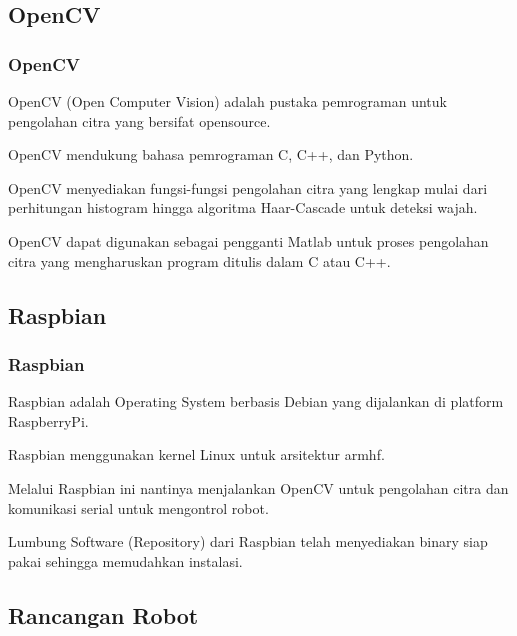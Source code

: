 \documentclass[table,dvipsnames]{beamer}
\begin{document}
\subsection{OpenCV}

\begin{frame}
\frametitle{OpenCV}
\begin{block}{}
OpenCV (Open Computer Vision) adalah pustaka pemrograman untuk pengolahan citra yang bersifat opensource.
\end{block}
\begin{block}{}
OpenCV mendukung bahasa pemrograman C, C++, dan Python.
\end{block}
\begin{block}{}
OpenCV menyediakan fungsi-fungsi pengolahan citra yang lengkap mulai dari perhitungan histogram hingga algoritma Haar-Cascade untuk deteksi wajah.
\end{block}
\begin{block}{}
OpenCV dapat digunakan sebagai pengganti Matlab untuk proses pengolahan citra yang mengharuskan program ditulis dalam C atau C++.
\end{block}
\end{frame}

\subsection{Raspbian}

\begin{frame}
\frametitle{Raspbian}
\begin{block}{}
Raspbian adalah Operating System berbasis Debian yang dijalankan di platform RaspberryPi.
\end{block}
\begin{block}{}
Raspbian menggunakan kernel Linux untuk arsitektur armhf.
\end{block}
\begin{block}{}
Melalui Raspbian ini nantinya menjalankan OpenCV untuk pengolahan citra dan komunikasi serial untuk mengontrol robot.
\end{block}
\begin{block}{}
Lumbung Software (Repository) dari Raspbian telah menyediakan binary siap pakai sehingga memudahkan instalasi.
\end{block}
\end{frame}

\subsection{Rancangan Robot}
\end{document}
